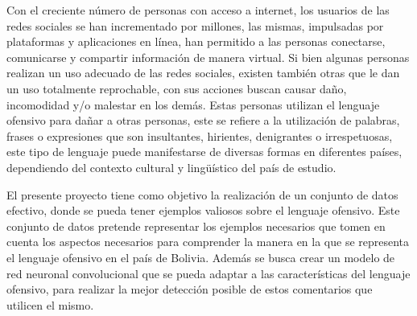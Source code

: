 	   
Con el creciente número de personas con acceso a internet, los usuarios de las redes sociales se han incrementado por millones, las mismas, impulsadas por plataformas y aplicaciones en línea, han  permitido a las personas conectarse, comunicarse y compartir información de manera virtual. Si bien algunas personas realizan un uso adecuado de las redes sociales, existen también otras que le dan un uso totalmente reprochable, con sus acciones buscan causar daño, incomodidad y/o malestar en los demás. Estas personas utilizan el lenguaje ofensivo para dañar a otras personas, este se refiere a la utilización de palabras, frases o expresiones que son insultantes, hirientes, denigrantes o irrespetuosas, este tipo de lenguaje puede manifestarse de diversas formas en diferentes países, dependiendo del contexto cultural y lingüístico del país de estudio.

 El presente proyecto tiene como objetivo la realización de un conjunto de datos efectivo, donde se pueda tener ejemplos valiosos sobre el lenguaje ofensivo. Este conjunto de datos pretende representar los ejemplos necesarios que tomen en cuenta los aspectos necesarios para comprender la manera en la que se representa el lenguaje ofensivo en el país de Bolivia. Además se busca crear un modelo de red neuronal convolucional que se pueda adaptar a las características del lenguaje ofensivo, para realizar la mejor detección posible de estos comentarios que utilicen el mismo.